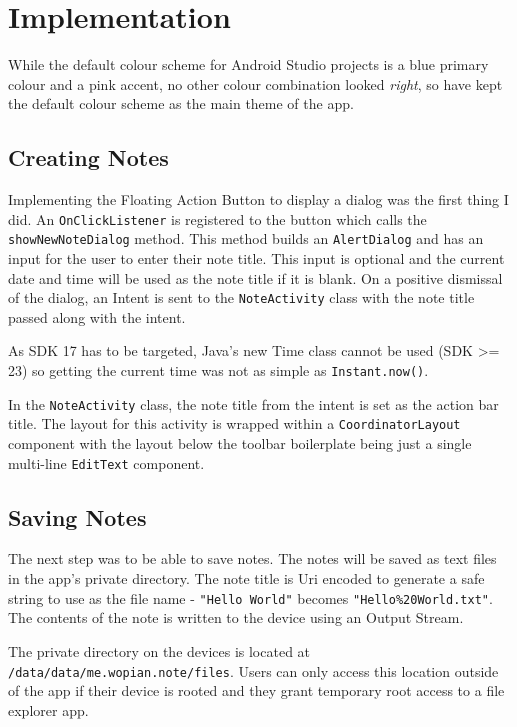 \chapter{Implementation}

While the default colour scheme for Android Studio projects is a blue primary colour and a pink accent, no other colour combination looked \textit{right}, so have kept the default colour scheme as the main theme of the app.

\section{Creating Notes}

Implementing the Floating Action Button to display a dialog was the first thing I did. An \texttt{OnClickListener} is registered to the button which calls the \texttt{showNewNoteDialog} method. This method builds an \texttt{AlertDialog} and has an input for the user to enter their note title. This input is optional and the current date and time will be used as the note title if it is blank. On a positive dismissal of the dialog, an Intent is sent to the \texttt{NoteActivity} class with the note title passed along with the intent.

As SDK 17 has to be targeted, Java's new Time class cannot be used (SDK >= 23) so getting the current time was not as simple as \texttt{Instant.now()}.

In the \texttt{NoteActivity} class, the note title from the intent is set as the action bar title. The layout for this activity is wrapped within a \texttt{CoordinatorLayout} component with the layout below the toolbar boilerplate being just a single multi-line \texttt{EditText} component.

\section{Saving Notes}

The next step was to be able to save notes. The notes will be saved as text files in the app's private directory. The note title is Uri encoded to generate a safe string to use as the file name - \texttt{"Hello World"} becomes \texttt{"Hello\%20World.txt"}. The contents of the note is written to the device using an Output Stream.

The private directory on the devices is located at \texttt{/data/data/me.wopian.note/files}. Users can only access this location outside of the app if their device is rooted and they grant temporary root access to a file explorer app.

